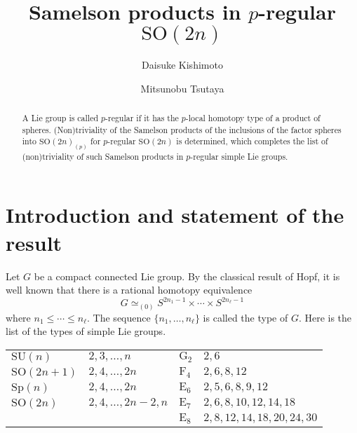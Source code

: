 \documentclass[12pt]{amsart}
\title{Samelson products in $p$-regular ${\mathrm{SO}}(2n)$}
\author{Daisuke Kishimoto}
\author{Mitsunobu Tsutaya}
\numberwithin{equation}{section}
\theoremstyle{definition}
\theoremstyle{remark}
\begin{document}
\maketitle

\baselineskip 16pt

\begin{abstract}
A Lie group is called $p$-regular if it has the $p$-local homotopy type of a product of spheres. (Non)triviality of the Samelson products of the inclusions of the factor spheres into ${\mathrm{SO}}(2n)_{(p)}$ for $p$-regular ${\mathrm{SO}}(2n)$ is determined, which completes the list of (non)triviality of such Samelson products in $p$-regular simple Lie groups.
\end{abstract}

\section{Introduction and statement of the result}

Let $G$ be a compact connected Lie group. By the classical result of Hopf, it is well known that there is a rational homotopy equivalence
$$G\simeq_{(0)}S^{2n_1-1}\times\cdots\times S^{2n_\ell-1}$$
where $n_1\le\cdots\le n_\ell$. The sequence $\{n_1,\ldots,n_\ell\}$ is called the type of $G$. Here is the list of the types of simple Lie groups.

\begin{table}[htbp]
\centering
\begin{tabular}{l|l||l|l}
\hline
$\mathrm{SU}(n)$&$2,3,\ldots,n$&$\mathrm{G}_2$&$2,6$\\
${\mathrm{SO}}(2n+1)$&$2,4,\ldots,2n$&$\mathrm{F}_4$&$2,6,8,12$\\
$\mathrm{Sp}(n)$&$2,4,\ldots,2n$&$\mathrm{E}_6$&$2,5,6,8,9,12$\\
${\mathrm{SO}}(2n)$&$2,4,\ldots,2n-2,n$&$\mathrm{E}_7$&$2,6,8,10,12,14,18$\\
&&$\mathrm{E}_8$&$2,8,12,14,18,20,24,30$\\\hline
\end{tabular}
\end{table}
\end{document}
